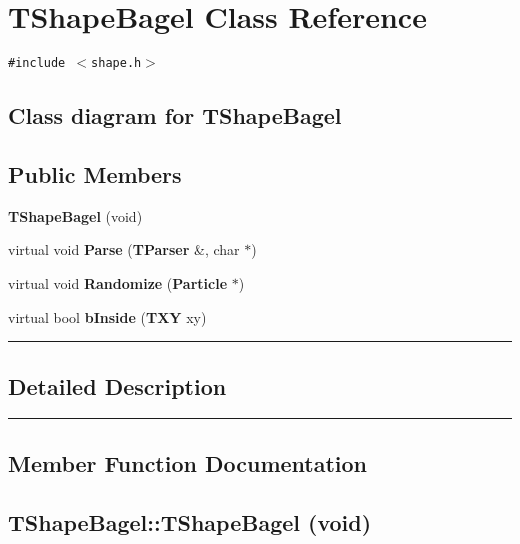 \section{TShapeBagel  Class Reference}
\label{TShapeBagel}


{\tt \#include $<$shape.h$>$}

\subsection*{Class diagram for TShapeBagel}
\begin{figure}[H]
\begin{center}
\leavevmode
\setlength{\epsfysize}{2cm}
\end{center}
\end{figure}
\subsection*{Public Members}
\begin{CompactItemize}
\item 
{\bf TShape\-Bagel} (void)
\item 
virtual void {\bf Parse} ({\bf TParser} \&, char $\ast$)
\item 
virtual void {\bf Randomize} ({\bf Particle} $\ast$)
\item 
virtual bool {\bf b\-Inside} ({\bf TXY} xy)
\end{CompactItemize}
\vspace{0.4cm}\hrule\vspace{0.2cm}
\subsection*{Detailed Description}
\vspace{0.4cm}\hrule\vspace{0.2cm}
\subsection*{Member Function Documentation}
\label{TShapeBagel_a0}
\subsection{\setlength{\rightskip}{0pt plus 5cm}TShape\-Bagel::TShape\-Bagel (void)}

